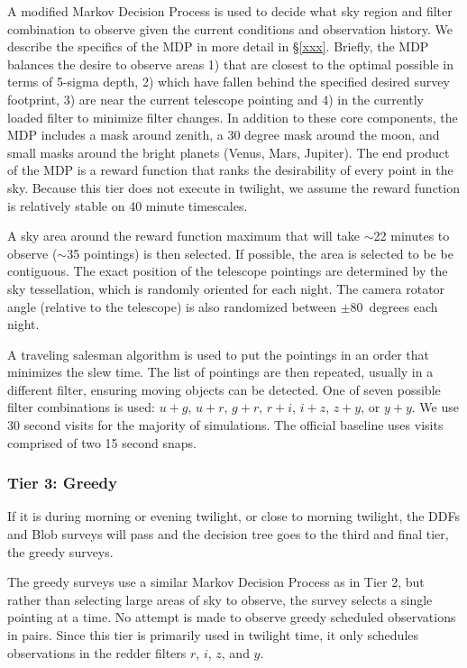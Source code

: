 A modified Markov Decision Process is used to decide what sky region and filter combination to observe given the current conditions and observation history.  We describe the specifics of the MDP in more detail in \S\ref{xxx}.  Briefly, the MDP balances the desire to observe areas 1) that are closest to the optimal possible in terms of 5-sigma depth, 2) which have fallen behind the specified desired survey footprint, 3) are near the current telescope pointing and 4) in the currently loaded filter to minimize filter changes.  In addition to these core components, the MDP includes a mask around zenith, a 30 degree mask around the moon, and small masks around the bright planets (Venus, Mars, Jupiter). The end product of the MDP is a reward function that ranks the desirability of every point in the sky. Because this tier does not execute in twilight, we assume the reward function is relatively stable on 40 minute timescales.

A sky area around the reward function maximum that will take $\sim$22 minutes to observe ($\sim$35 pointings) is then selected. If possible, the area is selected to be be contiguous.  The exact position of the telescope pointings are determined by the sky tessellation, which is randomly oriented for each night. The camera rotator angle (relative to the telescope) is also randomized between $\pm 80$\ degrees each night.

A traveling salesman algorithm is used to put the pointings in an order that minimizes the slew time. The list of pointings are then repeated, usually in a different filter, ensuring moving objects can be detected.  One of seven possible filter combinations is used: $u+g$, $u+r$, $g+r$, $r+i$, $i+z$, $z+y$, or $y+y$.  We use 30 second visits for the majority of simulations. The official baseline uses visits comprised of two 15 second snaps.  


\subsubsection{Tier 3:  Greedy}

If it is during morning or evening twilight, or close to morning twilight, the DDFs and Blob surveys will pass and the decision tree goes to the third and final tier, the greedy surveys. 

The greedy surveys use a similar Markov Decision Process as in Tier 2, but rather than selecting large areas of sky to observe, the survey selects a single pointing at a time.  No attempt is made to observe greedy scheduled observations in pairs.  Since this tier is primarily used in twilight time, it only schedules observations in the redder filters $r$, $i$, $z$, and $y$.  

